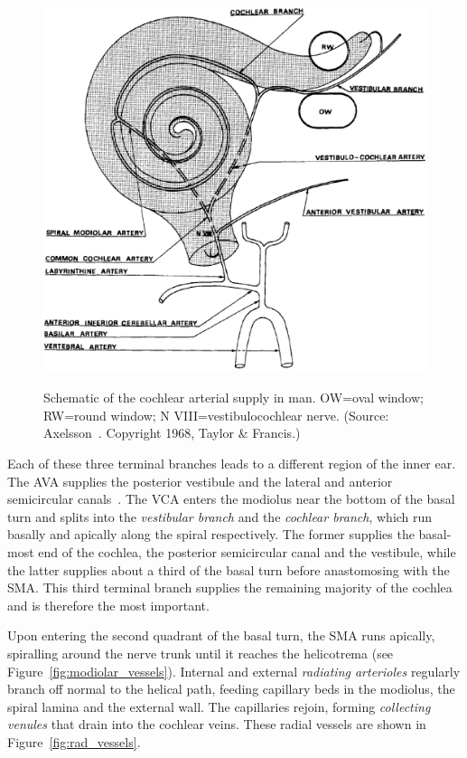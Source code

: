 \begin{figure}
	\centering
	\includegraphics[height=11.5cm]{Background/arterial_supply}
	\caption[Schematic of the cochlear arterial supply in man]{Schematic of the
	cochlear arterial supply in man. OW=oval window; RW=round window; N
	VIII=vestibulocochlear nerve. (Source: Axelsson~\cite{axelsson1968}. Copyright
	\textcopyright{} 1968, Taylor \& Francis.)}
	\label{fig:arterial_supply}
\end{figure}

Each of these three terminal branches leads to a different region of the inner
ear. The AVA supplies the posterior vestibule and the lateral and anterior
semicircular canals~\cite{leblanc1999}. The VCA enters the modiolus near the
bottom of the basal turn and splits into the \emph{vestibular branch} and the
\emph{cochlear branch}, which run basally and apically along the spiral
respectively. The former supplies the basal-most end of the cochlea, the
posterior semicircular canal and the vestibule, while the latter supplies about
a third of the basal turn before anastomosing with the SMA. This third terminal
branch supplies the remaining majority of the cochlea and is therefore the most
important.

Upon entering the second quadrant of the basal turn, the SMA runs apically,
spiralling around the nerve trunk until it reaches the helicotrema (see
Figure~\ref{fig:modiolar_vessels}). Internal and external \emph{radiating
arterioles} regularly branch off normal to the helical path, feeding capillary
beds in the modiolus, the spiral lamina and the external wall. The capillaries
rejoin, forming \emph{collecting venules} that drain into the cochlear veins.
These radial vessels are shown in Figure~\ref{fig:rad_vessels}.

